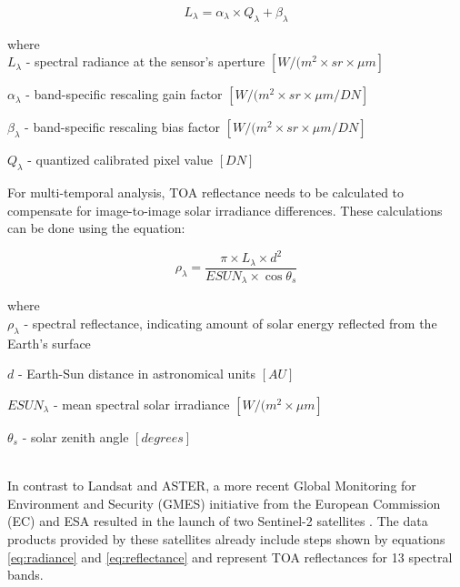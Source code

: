 \begin{samepage}
	\begin{equation}
	\label{eq:radiance}
	L_\lambda = \alpha_\lambda \times Q_\lambda + \beta_\lambda
	\end{equation}
	
	where
	\\
	
	$L_\lambda$ - spectral radiance at the sensor's aperture $[W/(m^2 \times sr \times \mu{m}]$
	
	$\alpha_\lambda$ - band-specific rescaling gain factor  $[W/(m^2 \times sr \times \mu{m} / DN]$
	
	$\beta_\lambda$ - band-specific rescaling bias factor  $[W/(m^2 \times sr \times \mu{m} / DN]$
	
	$Q_\lambda$ - quantized calibrated pixel value $[DN]$
	\\
\end{samepage}

For multi-temporal analysis, TOA reflectance needs to be calculated to compensate for image-to-image solar irradiance differences. These calculations can be done using the equation:

\begin{samepage}
	\begin{equation}
	\label{eq:reflectance}
	\rho_\lambda = \frac{\pi \times L_\lambda \times d^2}{ESUN_\lambda \times \cos \theta_s}
	\end{equation}
	
	where
	\\
	
	$\rho_\lambda$ - spectral reflectance, indicating amount of solar energy reflected from the Earth's surface
	
	$d$ - Earth-Sun distance in astronomical units $[AU]$
	
	$ESUN_\lambda$ - mean spectral solar irradiance $[W/(m^2 \times \mu{m}]$
	
	$\theta_s$ - solar zenith angle $[degrees]$
\end{samepage}
\\

In contrast to Landsat and ASTER, a more recent Global Monitoring for Environment and Security (GMES) initiative from the European Commission (EC) and ESA resulted in the launch of two Sentinel-2 satellites \citep{drusch2012sentinel}. The data products provided by these satellites already include steps shown by equations \eqref{eq:radiance} and \eqref{eq:reflectance} and represent TOA reflectances for 13 spectral bands. 

